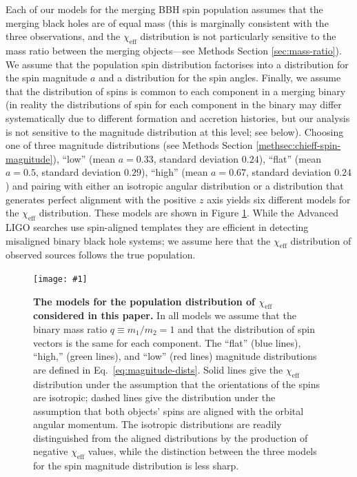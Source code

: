 \documentclass{nature}
\newcommand{\chieff}{\chi_\mathrm{eff}}
\newcommand{\plotone}[1]{\texttt{[image: \#1]}}
\begin{document}
Each of our models for the merging \ac{BBH} spin population assumes
that the merging black holes are of equal mass (this is marginally
consistent with the three observations\cite{O1-BBH}, and the $\chieff$
distribution is not particularly sensitive to the mass ratio between
the merging objects---see Methods Section \ref{sec:mass-ratio}).  We
assume that the population spin distribution factorises into a
distribution for the spin magnitude $a$ and a distribution for the
spin angles.  Finally, we assume that the distribution of spins is
common to each component in a merging binary (in reality the
distributions of spin for each component in the binary may differ
systematically due to different formation and accretion histories, but
our analysis is not sensitive to the magnitude distribution at this
level; see below).  Choosing one of three magnitude distributions (see
Methods Section \ref{methsec:chieff-spin-magnitude}), ``low'' (mean
$a = 0.33$, standard deviation $0.24$), ``flat'' (mean $a = 0.5$,
standard deviation $0.29$), ``high'' (mean $a = 0.67$, standard
deviation $0.24$) and pairing with either an isotropic angular
distribution or a distribution that generates perfect alignment with
the positive $z$ axis yields six different models for the $\chieff$
distribution.  These models are shown in Figure
\ref{fig:chieff-distribution-models}.  While the Advanced LIGO
searches use spin-aligned templates they are efficient in detecting
misaligned binary black hole systems\cite{2016PhRvD..93l2003A}; we
assume here that the $\chieff$ distribution of observed sources
follows the true population.

\begin{figure}
  \plotone{../plots/chi-eff-distributions}
  \caption{\label{fig:chieff-distribution-models} \textbf{The models for the
    population distribution of $\chieff$ considered in this paper.}  In
    all models we assume that the binary mass ratio
    $q \equiv m_1/m_2 = 1$ and that the distribution of spin vectors
    is the same for each component.  The ``flat'' (blue lines),
    ``high,'' (green lines), and ``low'' (red lines) magnitude
    distributions are defined in Eq.\ \eqref{eq:magnitude-dists}.
    Solid lines give the $\chieff$ distribution under the assumption
    that the orientations of the spins are isotropic; dashed lines
    give the distribution under the assumption that both objects'
    spins are aligned with the orbital angular momentum.  The
    isotropic distributions are readily distinguished from the aligned
    distributions by the production of negative $\chieff$ values,
    while the distinction between the three models for the spin
    magnitude distribution is less sharp.}
\end{figure}
\end{document}
